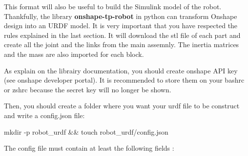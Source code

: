 \bigbreak

This format will also be useful to build the Simulink model of the robot. Thankfully, the library \textbf{onshape-tp-robot} in python can transform Onshape design into an URDF model. It is very important that you have respected the rules explained in the last section. It will download the stl file of each part and create all the joint and the links from the main assemnly. The inertia matrices and the mass are also imported for each block. 

\bigbreak

As explain on the librairy documentation, you should create onshape API key (see onshape developer portal). It is recommended to store them on your bashrc or zshrc because the secret key will no longer be shown.

\bigbreak
\begin{center}
    \begin{minipage}{10cm}
    \end{minipage}
\end{center}

\bigbreak

Then, you should create a folder where you want your urdf file to be construct and write a config.json file:
\begin{commandshell}
    mkdir -p robot\_urdf && touch robot\_urdf/config.json
\end{commandshell} 

\bigbreak
The config file must contain at least the following fields :
\begin{center}
    \begin{minipage}{8cm}
    \end{minipage}
\end{center}

